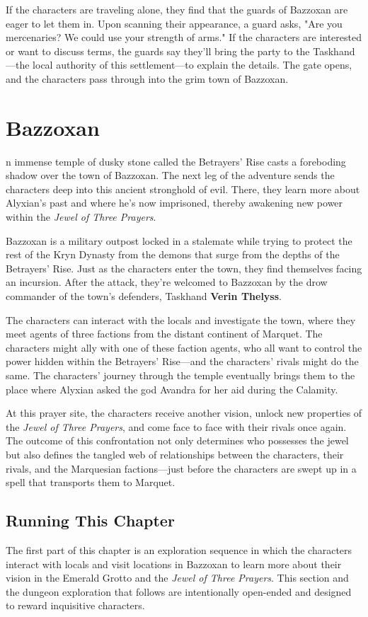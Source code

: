 \documentclass[10pt,a4paper,twoside,fancy,bg=print,twocolumn,openany,nodeprecatedcode]{dndbook}
\begin{document}
If the characters are traveling alone, they find that the guards of Bazzoxan are eager to let them in. Upon scanning their appearance, a guard asks, "Are you mercenaries? We could use your strength of arms." If the characters are interested or want to discuss terms, the guards say they'll bring the party to the Taskhand—the local authority of this settlement—to explain the details. The gate opens, and the characters pass through into the grim town of Bazzoxan.

\chapter{Bazzoxan}
n immense temple of dusky stone called the Betrayers' Rise casts a foreboding shadow over the town of Bazzoxan. The next leg of the adventure sends the characters deep into this ancient stronghold of evil. There, they learn more about Alyxian's past and where he's now imprisoned, thereby awakening new power within the \textit{Jewel of Three Prayers}.


Bazzoxan is a military outpost locked in a stalemate while trying to protect the rest of the Kryn Dynasty from the demons that surge from the depths of the Betrayers' Rise. Just as the characters enter the town, they find themselves facing an incursion. After the attack, they're welcomed to Bazzoxan by the drow commander of the town's defenders, Taskhand \textbf{Verin Thelyss}.

The characters can interact with the locals and investigate the town, where they meet agents of three factions from the distant continent of Marquet. The characters might ally with one of these faction agents, who all want to control the power hidden within the Betrayers' Rise—and the characters' rivals might do the same. The characters' journey through the temple eventually brings them to the place where Alyxian asked the god Avandra for her aid during the Calamity.

At this prayer site, the characters receive another vision, unlock new properties of the \textit{Jewel of Three Prayers}, and come face to face with their rivals once again. The outcome of this confrontation not only determines who possesses the jewel but also defines the tangled web of relationships between the characters, their rivals, and the Marquesian factions—just before the characters are swept up in a spell that transports them to Marquet.

\section{Running This Chapter}
The first part of this chapter is an exploration sequence in which the characters interact with locals and visit locations in Bazzoxan to learn more about their vision in the Emerald Grotto and the \textit{Jewel of Three Prayers}. This section and the dungeon exploration that follows are intentionally open-ended and designed to reward inquisitive characters.
\end{document}

